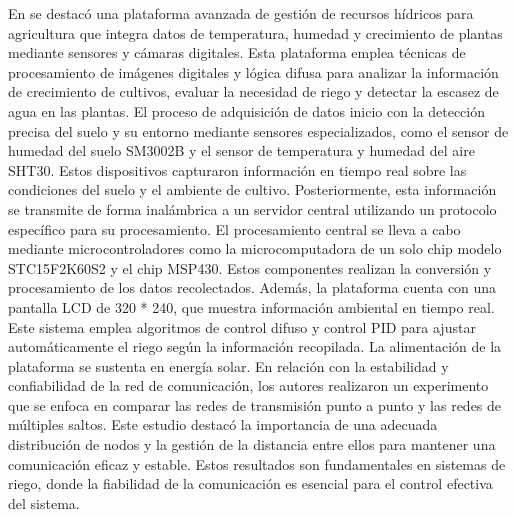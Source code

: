 \bigbreak
En \cite{haiyan_intelligent_2022} se destacó una plataforma avanzada de gestión de recursos hídricos para agricultura que integra datos de temperatura, humedad y crecimiento de plantas mediante sensores y cámaras digitales. Esta plataforma emplea técnicas de procesamiento de imágenes digitales y lógica difusa para analizar la información de crecimiento de cultivos, evaluar la necesidad de riego y detectar la escasez de agua en las plantas. El proceso de adquisición de datos inicio con la detección precisa del suelo y su entorno mediante sensores especializados, como el sensor de humedad del suelo SM3002B y el sensor de temperatura y humedad del aire SHT30. Estos dispositivos capturaron información en tiempo real sobre las condiciones del suelo y el ambiente de cultivo. Posteriormente, esta información se transmite de forma inalámbrica a un servidor central utilizando un protocolo específico para su procesamiento. El procesamiento central se lleva a cabo mediante microcontroladores como la microcomputadora de un solo chip modelo STC15F2K60S2 y el chip MSP430. Estos componentes realizan la conversión y procesamiento de los datos recolectados. Además, la plataforma cuenta con una pantalla LCD de 320 * 240, que muestra información ambiental en tiempo real. Este sistema emplea algoritmos de control difuso y control PID para ajustar automáticamente el riego según la información recopilada. La alimentación de la plataforma se sustenta en energía solar. En relación con la estabilidad y confiabilidad de la red de comunicación, los autores realizaron un experimento que se enfoca en comparar las redes de transmisión punto a punto y las redes de múltiples saltos. Este estudio destacó la importancia de una adecuada distribución de nodos y la gestión de la distancia entre ellos para mantener una comunicación eficaz y estable. Estos resultados son fundamentales en sistemas de riego, donde la fiabilidad de la comunicación es esencial para el control efectiva del sistema.

